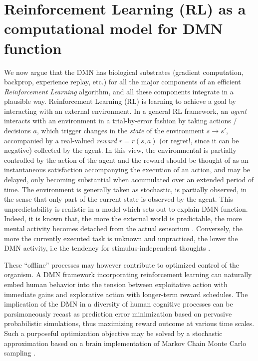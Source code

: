 \documentclass[10pt,letterpaper]{article}
\begin{document}
\section{Reinforcement Learning (RL) as a computational model for DMN function}
We now argue that the DMN has biological substrates (gradient
computation, backprop, experience replay, etc.) for all the
major components of an efficient \textit{Reinforcement Learning} algorithm, and all these
components integrate in a plausible way.
Reinforcement Learning (RL) is learning to achieve a goal by interacting with an external
environment. In a general RL framework, an \textit{agent}
interacts with an  environment in a trial-by-error fashion by taking
actions / decisions $a$, which trigger changes in the
\textit{state} of the environment
$s \rightarrow s'$, accompanied by a real-valued \textit{reward}
$r = r(s, a)$ (or regret!, since it can be negative) collected by the
agent. In this view, the environmental is partially controlled by
the action of the agent and the reward should be thought
of as an instantaneous satisfaction accompanying the execution of
an action, and may be delayed, only becoming substantial when accumulated over an extended period of time.
The environment is generally taken as stochastic,
is partially observed, in the sense that only part of the current state is observed by
the agent. This unpredictability
is realistic in a model which sets out
to explain DMN function. Indeed, it is known that, the more the external world is predictable,
the more mental activity becomes detached from the actual sensorium
\citep{antrobus1966studies, pope1978regulation}.
Conversely, the more the currently executed task is unknown and unpracticed,
the lower the DMN activity, i.e the tendency for stimulus-independent thoughts
\citep{filler1973daydreaming, teasdale1995stimulus}.

These ``offline'' processes may however contribute to optimized control of the organism.
A DMN framework incorporating reinforcement learning
can naturally embed human behavior
into the tension between exploitative action with immediate gains and
explorative action with longer-term reward schedules.
The implication of the DMN in a diversity of human cognitive processes
can be parsimoneously recast as prediction error minimization
based on pervasive probabilistic simulations,
thus maximizing reward outcome at various time scales.
Such a purposeful optimization objective
may be solved by a stochastic approximation
based on a brain implementation of Markov Chain Monte Carlo sampling
\citep{tenenbaum2011grow}.
\end{document}
